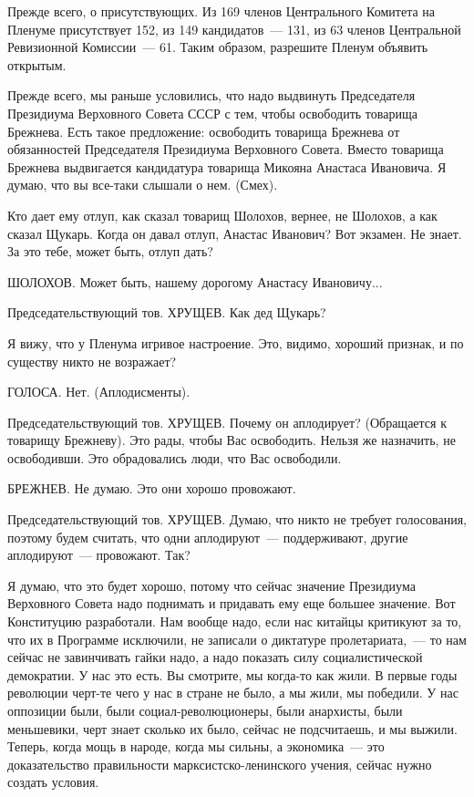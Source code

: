 \documentclass{kursa4}
\begin{document}
  {Прежде всего, о присутствующих. Из 169 членов
  Центрального Комитета на Пленуме присутствует 152, из 149 кандидатов~---
  131, из 63 членов Центральной Ревизионной Комиссии~--- 61. Таким образом,
  разрешите Пленум объявить открытым.}

  {Прежде всего, мы раньше условились, что надо выдвинуть
  Председателя Президиума Верховного Совета СССР с тем, чтобы освободить
  товарища Брежнева. Есть такое предложение: освободить товарища Брежнева
  от обязанностей Председателя Президиума Верховного Совета. Вместо
  товарища Брежнева выдвигается кандидатура товарища Микояна Анастаса
  Ивановича. Я думаю, что вы все-таки слышали о нем.
  (}\textcolor[rgb]{0.77254903,0.0,0.043137256}{Смех}{).}

  {Кто дает ему отлуп, как сказал товарищ Шолохов,
  вернее, не Шолохов, а как сказал Щукарь. Когда он давал отлуп, Анастас
  Иванович? Вот экзамен. Не знает. За это тебе, может быть, отлуп дать?}

  \textcolor[rgb]{0.77254903,0.0,0.043137256}{ШОЛОХОВ.}{
  Может быть, нашему дорогому Анастасу Ивановичу...}

  {Председательствующий тов. ХРУЩЕВ. Как дед Щукарь?}

  {Я вижу, что у Пленума игривое настроение. Это, видимо,
  хороший признак, и по существу никто не возражает?}

  \textcolor[rgb]{0.77254903,0.0,0.043137256}{ГОЛОСА.}{
  Нет.
  (}\textcolor[rgb]{0.77254903,0.0,0.043137256}{Аплодисменты}{).}

  {Председательствующий тов. ХРУЩЕВ. Почему он
  аплодирует? (}\textcolor[rgb]{0.77254903,0.0,0.043137256}{Обращается к
  товарищу Брежневу}{). Это рады, чтобы Вас освободить.
  Нельзя же назначить, не освободивши. Это обрадовались люди, что Вас
  освободили.}

  \textcolor[rgb]{0.77254903,0.0,0.043137256}{БРЕЖНЕВ.}{
  Не думаю. Это они хорошо провожают.}

  \textcolor[rgb]{0.77254903,0.0,0.043137256}{Председательствующий тов.
  ХРУЩЕВ.}{ Думаю, что никто не требует голосования,
  поэтому будем считать, что одни аплодируют~--- поддерживают, другие
  аплодируют~--- провожают. Так?}

  {Я думаю, что это будет хорошо, потому что сейчас
  значение Президиума Верховного Совета надо поднимать и придавать ему
  еще большее значение. Вот Конституцию разработали. Нам вообще надо,
  если нас китайцы критикуют за то, что их в Программе исключили, не
  записали о диктатуре пролетариата,~--- то нам сейчас не завинчивать гайки
  надо, а надо показать силу социалистической демократии. У нас это есть.
  Вы смотрите, мы когда-то как жили. В первые годы революции черт-те чего
  у нас в стране не было, а мы жили, мы победили. У нас оппозиции были,
  были социал-революционеры, были анархисты, были меньшевики, черт знает
  сколько их было, сейчас не подсчитаешь, и мы выжили. Теперь, когда мощь
  в народе, }{когда мы сильны, а экономика~--- это
  доказательство правильности марксистско-ленинского учения, сейчас нужно
  создать условия.}
\end{document}
